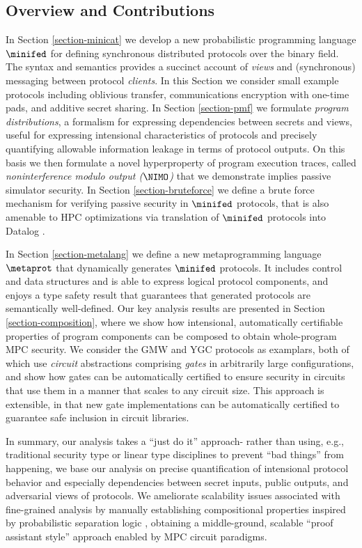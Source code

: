 \subsection{Overview and Contributions}

In Section \ref{section-minicat} we develop a new probabilistic programming
language $\minifed$ for defining synchronous distributed protocols
over the binary field. The syntax and semantics provides a succinct
account of \emph{views} and (synchronous) messaging between protocol
\emph{clients}. In this Section we consider small example protocols
including oblivious transfer, communications encryption with one-time
pads, and additive secret sharing. In Section \ref{section-pmf} we
formulate \emph{program distributions}, a formalism for expressing
dependencies between secrets and views, useful for expressing
intensional characteristics of protocols and precisely quantifying
allowable information leakage in terms of protocol outputs. On this
basis we then formulate a novel hyperproperty of program execution
traces, called \emph{noninterference modulo output ($\NIMO$)} that we
demonstrate implies passive simulator security. In Section
\ref{section-bruteforce} we define a brute force mechanism for
verifying passive security in $\minifed$ protocols, that is also
amenable to HPC optimizations via translation of $\minifed$ protocols
into Datalog .

In Section \ref{section-metalang} we define a new metaprogramming
language $\metaprot$ that dynamically generates $\minifed$
protocols. It includes control and data structures and is able to
express logical protocol components, and enjoys a type safety result
that guarantees that generated protocols are semantically
well-defined. Our key analysis results are presented in Section
\ref{section-composition}, where we show how intensional,
automatically certifiable properties of program components can be
composed to obtain whole-program MPC security. We consider the GMW and
YGC protocols as examplars, both of which use \emph{circuit}
abstractions comprising \emph{gates} in arbitrarily large
configurations, and show how gates can be automatically certified to
ensure security in circuits that use them in a manner that scales to
any circuit size. This approach is extensible, in that new gate
implementations can be automatically certified to guarantee safe
inclusion in circuit libraries.

In summary, our analysis takes a ``just do it'' approach- rather than
using, e.g., traditional security type or linear type disciplines to
prevent ``bad things'' from happening, we base our analysis on precise
quantification of intensional protocol behavior and especially
dependencies between secret inputs, public outputs, and adversarial
views of protocols. We ameliorate scalability issues associated with
fine-grained analysis by manually establishing compositional
properties inspired by probabilistic separation logic
\cite{barthe2019probabilistic}, obtaining a middle-ground, scalable
``proof assistant style'' approach enabled by MPC circuit paradigms.
